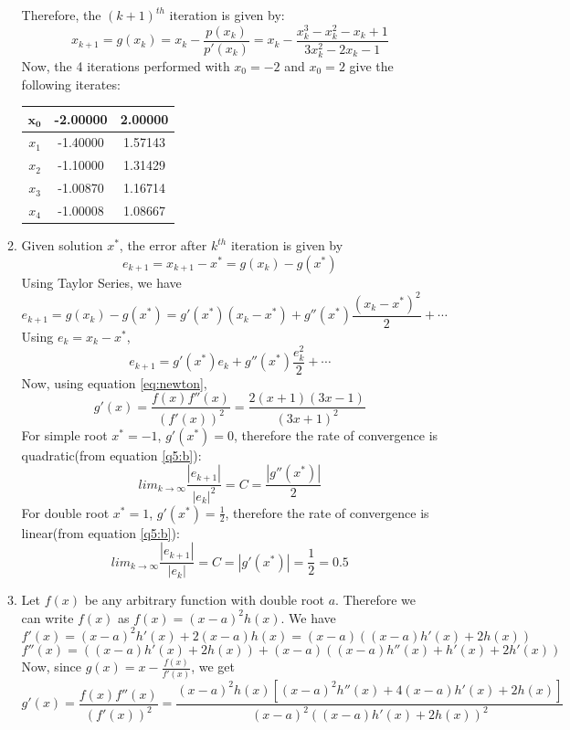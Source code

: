 \documentclass{article}
\begin{document}
\begin{enumerate}
\begin{enumerate}[label=(\alph*)]
\begin{equation}
        \end{equation}
        Therefore, the $(k + 1)^{th}$ iteration is given by:
        $$x_{k + 1} = g(x_k) = x_k - \frac{p(x_k)}{p'(x_k)} = x_k - \frac{x_k^3 - x_k^2 - x_k + 1}{3x_k^2 - 2x_k - 1}$$
        Now, the 4 iterations performed with $x_0 = -2$ and $x_0 = 2$ give the following iterates:
        \begin{center}
        \begin{tabular}{c | c | c}
        $\mathbf{x_0}$ & -2.00000 & 2.00000 \\
        \hline
        $x_1$ & -1.40000 & 1.57143 \\
        $x_2$ & -1.10000 & 1.31429 \\
        $x_3$ & -1.00870 & 1.16714 \\
        $x_4$ & -1.00008 & 1.08667 \\
        \end{tabular}
        \end{center}
        \item Given solution $x^*$, the error after $k^{th}$ iteration is given by
        $$e_{k + 1} = x_{k + 1} - x^* = g(x_k) - g(x^*)$$
        Using Taylor Series, we have
        $$e_{k + 1} = g(x_k) - g(x^*) = g'(x^*)(x_k - x^*) + g''(x^*)\frac{(x_k - x^*)^2}{2} + \cdots$$
        Using $e_k = x_k - x^*$,
        \begin{equation}
        e_{k + 1} = g'(x^*)e_k + g''(x^*)\frac{e_k^2}{2} + \cdots
        \label{q5:b}
        \end{equation}
        Now, using equation \ref{eq:newton},
        $$g'(x) = \frac{f(x)f''(x)}{(f'(x))^2} = \frac{2(x + 1)(3x - 1)}{(3x + 1)^2}$$
        For simple root $x^* = -1$, $g'(x^*) = 0$, therefore the rate of convergence is quadratic(from equation \ref{q5:b}):
        $$lim_{k \rightarrow \infty}\frac{|e_{k + 1}|}{|e_k|^2} = C = \frac{|g''(x^*)|}{2}$$
        For double root $x^* = 1$, $g'(x^*) = \frac{1}{2}$, therefore the rate of convergence is linear(from equation \ref{q5:b}):
        $$lim_{k \rightarrow \infty}\frac{|e_{k + 1}|}{|e_k|} = C = |g'(x^*)| = \frac{1}{2} = 0.5$$
        \item Let $f(x)$ be any arbitrary function with double root $a$. Therefore we can write $f(x)$ as $f(x) = (x - a)^2h(x)$. We have
        $$f'(x) = (x - a)^2h'(x) + 2(x - a)h(x) = (x - a)((x - a)h'(x) + 2h(x))$$
        $$f''(x) = ((x - a)h'(x) + 2h(x)) + (x - a)((x - a)h''(x) + h'(x) + 2h'(x))$$
        Now, since $g(x) = x - \frac{f(x)}{f'(x)}$, we get
        $$g'(x) = \frac{f(x)f''(x)}{(f'(x))^2} = \frac{(x - a)^2h(x)[(x - a)^2h''(x) + 4(x - a)h'(x) + 2h(x)]}{(x - a)^2((x - a)h'(x) + 2h(x))^2}$$

\end{enumerate}
\end{enumerate}
\end{document}
